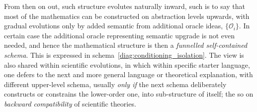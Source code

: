 From then on out, such structure evolutes naturally inward, such is to say that most of the mathematics can be constructed on abstraction levels upwards, with gradual evolutions only by added semantic from additional oracle ideas, $\{\mathcal{O}_{i}\}$. In certain case the additional oracle representing semantic upgrade is not even needed, and hence the mathematical structure is then a \textit{funnelled self-contained schema}. This is expressed in schema~\ref{diag:conditioning_isolation}. The view is also shared within scientific evolutions, in which within specific starter language, one defers to the next and more general language or theoretical explanation, with different upper-level schema, usually \textit{only if} the next schema deliberately constructs or constrains the lower-order one, into sub-structure of itself; the so on \textit{backward compatibility} of scientific theories. 

